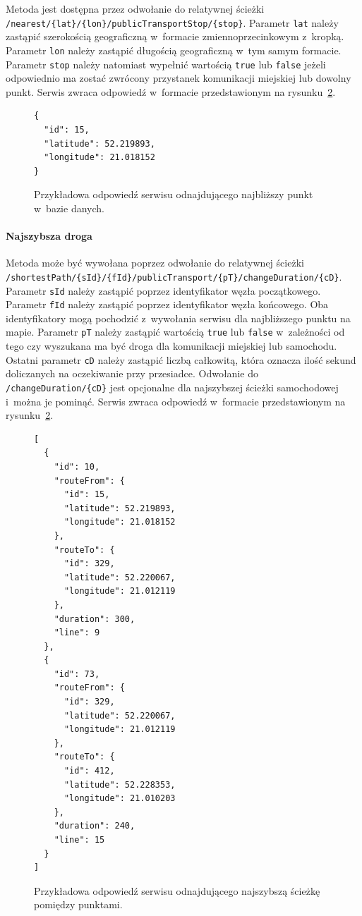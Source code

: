\documentclass[a4paper,12pt]{article}
\begin{document}
	Metoda jest dostępna przez odwołanie do relatywnej ścieżki \Verb+/nearest/{lat}/{lon}/publicTransportStop/{stop}+. Parametr \Verb+lat+ należy zastąpić szerokością geograficzną w~formacie zmiennoprzecinkowym z~kropką. Parametr \Verb+lon+ należy zastąpić długością geograficzną w~tym samym formacie. Parametr \Verb+stop+ należy natomiast wypełnić wartością \Verb+true+ lub \Verb+false+ jeżeli odpowiednio ma zostać zwrócony przystanek komunikacji miejskiej lub dowolny punkt. Serwis zwraca odpowiedź w~formacie przedstawionym na rysunku~\ref{vrb:entry_service_response}.

	\begin{figure}[ht!]
		\centering
		\begin{BVerbatim}
{
  "id": 15,
  "latitude": 52.219893,
  "longitude": 21.018152
}
		\end{BVerbatim}
		\caption{Przykładowa odpowiedź serwisu odnajdującego najbliższy punkt w~bazie danych.}
		\label{vrb:entry_service_response}
	\end{figure}	

	\paragraph{Najszybsza droga}

	Metoda może być wywołana poprzez odwołanie do relatywnej ścieżki \Verb+/shortestPath/{sId}/{fId}/publicTransport/{pT}/changeDuration/{cD}+. Parametr \Verb+sId+ należy zastąpić poprzez identyfikator węzła początkowego. Parametr \Verb+fId+ należy zastąpić poprzez identyfikator węzła końcowego. Oba identyfikatory mogą pochodzić z~wywołania serwisu dla najbliższego punktu na mapie. Parametr \Verb+pT+ należy zastąpić wartością \Verb+true+ lub \Verb+false+ w~zależności od tego czy wyszukana ma być droga dla komunikacji miejskiej lub samochodu. Ostatni parametr \Verb+cD+ należy zastąpić liczbą całkowitą, która oznacza ilość sekund doliczanych na oczekiwanie przy przesiadce. Odwołanie do \Verb+/changeDuration/{cD}+ jest opcjonalne dla najszybszej ścieżki samochodowej i~można je pominąć. Serwis zwraca odpowiedź w~formacie przedstawionym na rysunku~\ref{vrb:entry_service_response}.

	\begin{figure}[ht!]
		\centering
		\begin{BVerbatim}
[
  {
    "id": 10,
    "routeFrom": {
      "id": 15,
      "latitude": 52.219893,
      "longitude": 21.018152
    },
    "routeTo": {
      "id": 329,
      "latitude": 52.220067,
      "longitude": 21.012119
    },
    "duration": 300,
    "line": 9
  },
  {
    "id": 73,
    "routeFrom": {
      "id": 329,
      "latitude": 52.220067,
      "longitude": 21.012119
    },
    "routeTo": {
      "id": 412,
      "latitude": 52.228353,
      "longitude": 21.010203
    },
    "duration": 240,
    "line": 15
  }
]
		\end{BVerbatim}
		\caption{Przykładowa odpowiedź serwisu odnajdującego najszybszą ścieżkę pomiędzy punktami.}
		\label{vrb:entry_service_response}
	\end{figure}	
\end{document}
